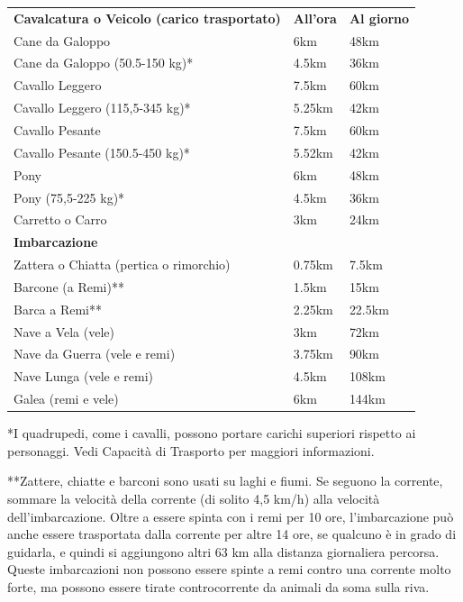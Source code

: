 \documentclass[a4paper,11pt,twoside,openany]{book}
\begin{document}
\begin{tabular}{lll}
	\toprule
	\textbf{Cavalcatura o Veicolo (carico trasportato)} & \textbf{All'ora} & \textbf{Al giorno}\\
	Cane da Galoppo     & 6km              & 48km              \\
	Cane da Galoppo (50.5-150 kg)*      & 4.5km            & 36km              \\
	Cavallo Leggero     & 7.5km            & 60km              \\
	Cavallo Leggero (115,5-345 kg)*     & 5.25km           & 42km              \\
	Cavallo Pesante     & 7.5km            & 60km              \\
	Cavallo Pesante (150.5-450 kg)*     & 5.52km           & 42km              \\
	Pony& 6km              & 48km              \\
	Pony (75,5-225 kg)* & 4.5km            & 36km              \\
	Carretto o Carro    & 3km              & 24km              \\
	\textbf{Imbarcazione}               &  &   \\
	Zattera o Chiatta (pertica o rimorchio)             & 0.75km           & 7.5km             \\
	Barcone (a Remi)**  & 1.5km            & 15km              \\
	Barca a Remi**      & 2.25km           & 22.5km            \\
	Nave a Vela (vele)  & 3km              & 72km              \\
	Nave da Guerra (vele e remi)        & 3.75km           & 90km              \\
	Nave Lunga (vele e remi)            & 4.5km            & 108km             \\
	Galea (remi e vele) & 6km              & 144km             \\
\end{tabular}

*I quadrupedi, come i cavalli, possono portare carichi superiori rispetto ai personaggi. Vedi Capacità di Trasporto per maggiori informazioni.

**Zattere, chiatte e barconi sono usati su laghi e fiumi. Se seguono la corrente, sommare la velocità della corrente (di solito 4,5 km/h) alla velocità dell'imbarcazione. Oltre a essere spinta con i remi per 10 ore, l'imbarcazione può anche essere trasportata dalla corrente per altre 14 ore, se qualcuno è in grado di guidarla, e quindi si aggiungono altri 63 km alla distanza giornaliera percorsa. Queste imbarcazioni non possono essere spinte a remi contro una corrente molto forte, ma possono essere tirate controcorrente da animali da soma sulla riva.
\end{document}
